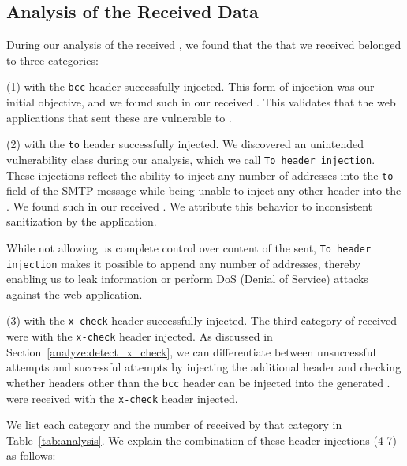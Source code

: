 
\subsection{Analysis of the Received \Email Data}

During our analysis of the received \emails, we found that the \emails that we received belonged to three categories:

(1) \Emails with the \texttt{bcc} header successfully injected. This form
of injection was our initial objective, and we found
\ehibcc such \emails in our received \emails. This validates that the
web applications that sent these \emails are vulnerable to \ehi.
	
(2) \Emails with the \texttt{to} header successfully injected. We
discovered an unintended vulnerability class during our analysis,
which we call \texttt{To~header injection}. These injections reflect
the ability to inject any number of \email addresses into the
\texttt{to} field of the SMTP message while being unable to inject any
other header into the \emails. We found \ehito such \emails in our
received \emails. We attribute this behavior to inconsistent
sanitization by the application.
   
While not allowing us complete control over content of the \emails
sent, \texttt{To header injection} makes it possible to append any
number of \email addresses, thereby enabling us to leak information or
perform DoS (Denial of Service) attacks against the web application.
	
(3) \Emails with the \texttt{x-check} header successfully injected. The
third category of \emails received were \emails with the
\texttt{x-check} header injected. As discussed in
Section~\ref{analyze:detect_x_check}, we can differentiate between
unsuccessful attempts and successful attempts by injecting the
additional header and checking whether headers other than the
\texttt{bcc} header can be injected into the generated \email.
\ehixcheck \emails were received with the \texttt{x-check} header
injected.

We list each category and the number of \emails received by that
category in Table~\ref{tab:analysis}. We explain the combination of
these header injections (4-7) as follows:



